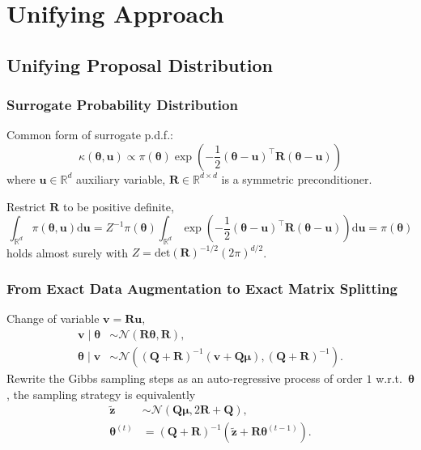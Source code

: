 \documentclass[aspectratio=169]{beamer}
\newcommand{\B}[1]{\mathbf{#1}} %
\newcommand{\Bs}[1]{\boldsymbol{#1}} %
\newcommand{\pr}[1]{\left(#1\right)} %
\begin{document}
\section{Unifying Approach}
\subsection{Unifying Proposal Distribution}
\begin{frame}
\frametitle{Surrogate Probability Distribution}
Common form of surrogate p.d.f.:
\[
  \kappa(\Bs{\theta},\B{u}) \propto \pi(\Bs{\theta})\exp\pr{-\frac{1}{2}(\Bs{\theta}-\B{u})^{\top}\B{R}(\Bs{\theta}-\B{u})}\]
  where $\B{u} \in \mathbb{R}^d$ auxiliary variable, $\B{R} \in \mathbb{R}^{d \times d}$ is a symmetric preconditioner.

Restrict $\B{R}$ to be positive definite,
\[  \int_{\mathbb{R}^d} \pi(\Bs{\theta},\B{u}) \mathrm{d}\B{u} = Z^{-1}\pi(\Bs{\theta})\int_{\mathbb{R}^d} \exp\pr{-\frac{1}{2}(\Bs{\theta}-\B{u})^{\top}\B{R}(\Bs{\theta}-\B{u})}\mathrm{d}\B{u} = \pi(\Bs{\theta})\]
holds almost surely with $Z = \mathrm{det}(\B{R})^{-1/2}(2\pi)^{d/2}$.
\end{frame}

\begin{frame}
  \frametitle{From Exact Data Augmentation to Exact Matrix Splitting}
Change of variable $\B{v} = \B{Ru}$,
\[
  \begin{aligned}
    \B{v}\mid\Bs{\theta} &\sim \mathcal{N}\pr{\B{R}\Bs{\theta},\B{R}},\\
    \Bs{\theta}\mid\B{v} &\sim \mathcal{N}\pr{(\B{Q} + \B{R})^{-1}(\B{v}+\B{Q}\Bs{\mu}),(\B{Q} + \B{R})^{-1}}.
  \end{aligned}  
\]
Rewrite the Gibbs sampling steps as an auto-regressive process of order \(1\) w.r.t.\ $\Bs{\theta}$, the sampling strategy is equivalently
\[
\begin{aligned}
  \tilde{\B{z}} &\sim  \mathcal{N}\pr{\B{Q}\Bs{\mu}, 2\B{R} + \B{Q}},\\
  \Bs{\theta}^{(t)} & = \pr{\B{Q}+\B{R}}^{-1}\pr{\tilde{\B{z}}+\B{R}\Bs{\theta}^{(t-1)}}.
\end{aligned} 
\]
\end{frame}
\end{document}
